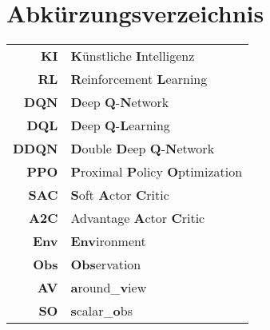 \chapter{Abkürzungsverzeichnis}
\begin{center}
\begin{tabular}{rl}
\textbf{KI} & \textbf{K}ünstliche \textbf{I}ntelligenz\\
\textbf{RL} & \textbf{R}einforcement \textbf{L}earning \\
\textbf{DQN} & \textbf{D}eep \textbf{Q}-\textbf{N}etwork\\
\textbf{DQL} & \textbf{D}eep \textbf{Q}-\textbf{L}earning\\
\textbf{DDQN} & \textbf{D}ouble \textbf{D}eep \textbf{Q}-\textbf{N}etwork\\
\textbf{PPO} & \textbf{P}roximal \textbf{P}olicy \textbf{O}ptimization\\
\textbf{SAC} & \textbf{S}oft \textbf{A}ctor \textbf{C}ritic\\
\textbf{A2C} & Advantage \textbf{A}ctor \textbf{C}ritic\\
\textbf{Env} & \textbf{Env}ironment \\
\textbf{Obs} & \textbf{Obs}ervation \\
\textbf{AV} & \textbf{a}round\_\textbf{v}iew \\
\textbf{SO} & \textbf{s}calar\_\textbf{o}bs \\
\end{tabular}
\end{center}
 